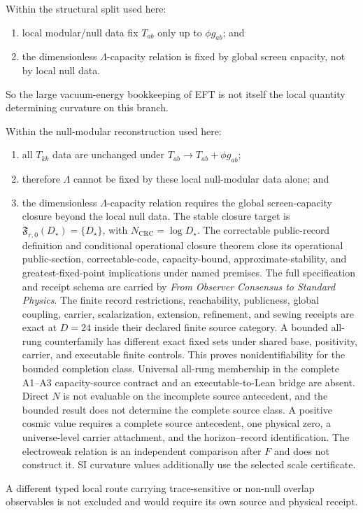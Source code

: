 \begin{proposition}
Within the structural split used here:
\begin{enumerate}[leftmargin=2em]
\item local modular/null data fix \(T_{ab}\) only up to \(\phi g_{ab}\); and
\item the dimensionless \(\Lambda\)-capacity relation is fixed by global screen capacity, not by local null data.
\end{enumerate}
So the large vacuum-energy bookkeeping of EFT is not itself the local quantity determining
curvature on this branch.
\end{proposition}

\begin{theorem}
Within the null-modular reconstruction used here:
\begin{enumerate}[leftmargin=2em]
\item all \(T_{kk}\) data are unchanged under \(T_{ab}\to T_{ab}+\phi g_{ab}\);
\item therefore \(\Lambda\) cannot be fixed by these local null-modular data alone; and
\item the dimensionless \(\Lambda\)-capacity relation requires the global
screen-capacity closure beyond the local null data. The stable closure target is
\(\mathfrak F_{r,0}(D_\star)=\{D_\star\}\), with
\(N_{\mathrm{CRC}}=\log D_\star\). The correctable public-record definition and
conditional operational closure theorem close its operational
public-section, correctable-code, capacity-bound, approximate-stability, and
greatest-fixed-point implications under named premises. The full specification
and receipt schema are carried by \emph{From Observer Consensus to Standard Physics}. The
finite record restrictions, reachability, publicness, global coupling,
carrier, scalarization, extension, refinement, and sewing receipts are exact
at \(D=24\) inside their declared finite source category. A bounded all-rung
counterfamily has different
exact fixed sets under shared base, positivity, carrier, and executable finite
controls. This proves nonidentifiability for the bounded completion class.
Universal all-rung membership in the complete A1--A3 capacity-source contract
and an executable-to-Lean bridge are absent. Direct \(N\) is not evaluable on
the incomplete source antecedent, and the bounded result does not determine
the complete source class. A positive cosmic value requires a complete source antecedent, one
physical zero, a universe-level carrier attachment, and the horizon--record
identification.
The electroweak relation is an independent comparison after \(F\) and does
not construct it. SI curvature values additionally use the selected scale
certificate.
\end{enumerate}
A different typed local route carrying trace-sensitive or non-null overlap
observables is not excluded and would require its own source and physical
receipt.
\end{theorem}

